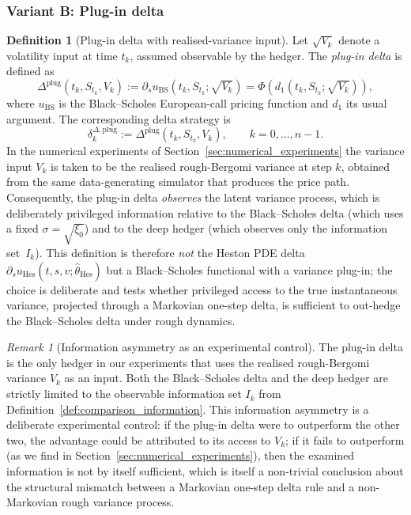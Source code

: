 \documentclass[12pt,a4paper]{article}
\theoremstyle{definition}
\newtheorem{definition}{Definition}[section]
\theoremstyle{plain}
\theoremstyle{remark}
\newtheorem{remark}{Remark}[section]
\theoremstyle{plain}
\begin{document}
\subsubsection{Variant B: Plug-in delta}
\label{subsubsec:heston_delta}

\begin{definition}[Plug-in delta with realised-variance input]\label{def:plugin_delta}
Let $\sqrt{V_k}$ denote a volatility input at time $t_k$, assumed observable by the hedger. The \emph{plug-in delta} is defined as
\[
\Delta^{\mathrm{plug}}(t_k, S_{t_k}, V_k) := \partial_s u_{\mathrm{BS}}\!\left(t_k, S_{t_k}; \sqrt{V_k}\right) = \Phi\!\left(d_1(t_k, S_{t_k}; \sqrt{V_k})\right),
\]
where $u_{\mathrm{BS}}$ is the Black--Scholes European-call pricing function and $d_1$ its usual argument. The corresponding delta strategy is
\[
\delta_k^{\Delta, \mathrm{plug}} := \Delta^{\mathrm{plug}}(t_k, S_{t_k}, V_k), \qquad k = 0, \ldots, n-1.
\]
In the numerical experiments of Section~\ref{sec:numerical_experiments} the variance input $V_k$ is taken to be the realised rough-Bergomi variance at step $k$, obtained from the same data-generating simulator that produces the price path. Consequently, the plug-in delta \emph{observes} the latent variance process, which is deliberately privileged information relative to the Black--Scholes delta (which uses a fixed $\sigma = \sqrt{\xi_0}$) and to the deep hedger (which observes only the information set~$I_k$). This definition is therefore \emph{not} the Heston PDE delta $\partial_s u_{\mathrm{Hes}}(t, s, v; \hat\theta_{\mathrm{Hes}})$ but a Black--Scholes functional with a variance plug-in; the choice is deliberate and tests whether privileged access to the true instantaneous variance, projected through a Markovian one-step delta, is sufficient to out-hedge the Black--Scholes delta under rough dynamics.
\end{definition}

\begin{remark}[Information asymmetry as an experimental control]\label{rem:plugin_information_asymmetry}
The plug-in delta is the only hedger in our experiments that uses the realised rough-Bergomi variance $V_k$ as an input. Both the Black--Scholes delta and the deep hedger are strictly limited to the observable information set $I_k$ from Definition~\ref{def:comparison_information}. This information asymmetry is a deliberate experimental control: if the plug-in delta were to outperform the other two, the advantage could be attributed to its access to $V_k$; if it fails to outperform (as we find in Section~\ref{sec:numerical_experiments}), then the examined information is not by itself sufficient, which is itself a non-trivial conclusion about the structural mismatch between a Markovian one-step delta rule and a non-Markovian rough variance process.
\end{remark}
\end{document}
